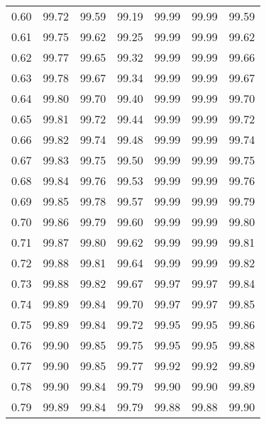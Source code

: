 \begin{tabular}{|c|c|c|c|c|c|c|}
      0.60 &     99.72 &     99.59 &      99.19 &   99.99 &      99.99 &         99.59 \\
      0.61 &     99.75 &     99.62 &      99.25 &   99.99 &      99.99 &         99.62 \\
      0.62 &     99.77 &     99.65 &      99.32 &   99.99 &      99.99 &         99.66 \\
      0.63 &     99.78 &     99.67 &      99.34 &   99.99 &      99.99 &         99.67 \\
      0.64 &     99.80 &     99.70 &      99.40 &   99.99 &      99.99 &         99.70 \\
      0.65 &     99.81 &     99.72 &      99.44 &   99.99 &      99.99 &         99.72 \\
      0.66 &     99.82 &     99.74 &      99.48 &   99.99 &      99.99 &         99.74 \\
      0.67 &     99.83 &     99.75 &      99.50 &   99.99 &      99.99 &         99.75 \\
      0.68 &     99.84 &     99.76 &      99.53 &   99.99 &      99.99 &         99.76 \\
      0.69 &     99.85 &     99.78 &      99.57 &   99.99 &      99.99 &         99.79 \\
      0.70 &     99.86 &     99.79 &      99.60 &   99.99 &      99.99 &         99.80 \\
      0.71 &     99.87 &     99.80 &      99.62 &   99.99 &      99.99 &         99.81 \\
      0.72 &     99.88 &     99.81 &      99.64 &   99.99 &      99.99 &         99.82 \\
      0.73 &     99.88 &     99.82 &      99.67 &   99.97 &      99.97 &         99.84 \\
      0.74 &     99.89 &     99.84 &      99.70 &   99.97 &      99.97 &         99.85 \\
      0.75 &     99.89 &     99.84 &      99.72 &   99.95 &      99.95 &         99.86 \\
      0.76 &     99.90 &     99.85 &      99.75 &   99.95 &      99.95 &         99.88 \\
      0.77 &     99.90 &     99.85 &      99.77 &   99.92 &      99.92 &         99.89 \\
      0.78 &     99.90 &     99.84 &      99.79 &   99.90 &      99.90 &         99.89 \\
      0.79 &     99.89 &     99.84 &      99.79 &   99.88 &      99.88 &         99.90 \\

\end{tabular}
